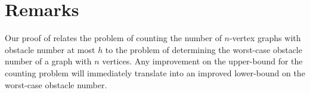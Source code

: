 \documentclass{patmorin}
\DeclareMathOperator{\obs}{obs}
\begin{document}
%
%
%
%
%

\section{Remarks}

Our proof of  relates the problem of counting the number
of $n$-vertex graphs with obstacle number at most $h$ to the problem of
determining the worst-case obstacle number of a graph with $n$ vertices.
Any improvement on the upper-bound for the counting problem will
immediately translate into an improved lower-bound on the worst-case
obstacle number.
\end{document}
